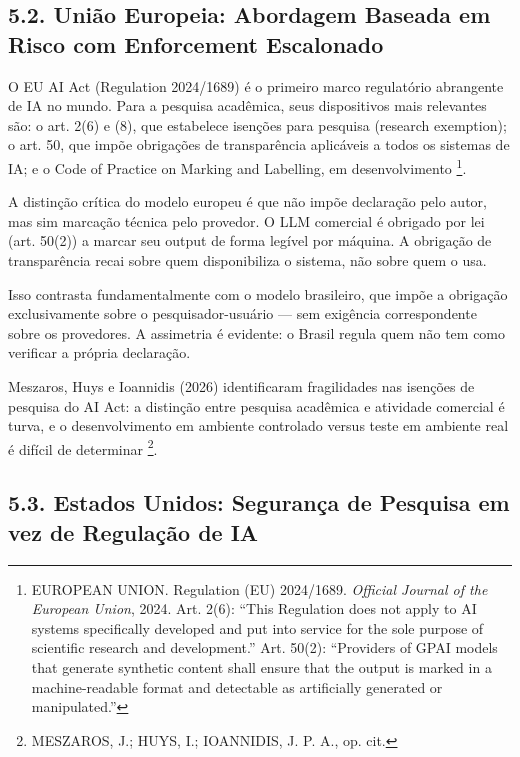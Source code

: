 \documentclass[
  12pt,
  a4paper,
  brazil,
  twoside
]{report}
\begin{document}
\subsection{5.2. União Europeia: Abordagem Baseada em Risco com
Enforcement
Escalonado}\label{uniuxe3o-europeia-abordagem-baseada-em-risco-com-enforcement-escalonado}

O EU AI Act (Regulation 2024/1689) é o primeiro marco regulatório
abrangente de IA no mundo. Para a pesquisa acadêmica, seus dispositivos
mais relevantes são: o art. 2(6) e (8), que estabelece isenções para
pesquisa (research exemption); o art. 50, que impõe obrigações de
transparência aplicáveis a todos os sistemas de IA; e o Code of Practice
on Marking and Labelling, em desenvolvimento \footnote{EUROPEAN UNION.
  Regulation (EU) 2024/1689. \emph{Official Journal of the European
  Union}, 2024. Art. 2(6): ``This Regulation does not apply to AI
  systems specifically developed and put into service for the sole
  purpose of scientific research and development.'' Art. 50(2):
  ``Providers of GPAI models that generate synthetic content shall
  ensure that the output is marked in a machine-readable format and
  detectable as artificially generated or manipulated.''}.

A distinção crítica do modelo europeu é que não impõe declaração pelo
autor, mas sim marcação técnica pelo provedor. O LLM comercial é
obrigado por lei (art. 50(2)) a marcar seu output de forma legível por
máquina. A obrigação de transparência recai sobre quem disponibiliza o
sistema, não sobre quem o usa.

Isso contrasta fundamentalmente com o modelo brasileiro, que impõe a
obrigação exclusivamente sobre o pesquisador-usuário --- sem exigência
correspondente sobre os provedores. A assimetria é evidente: o Brasil
regula quem não tem como verificar a própria declaração.

Meszaros, Huys e Ioannidis (2026) identificaram fragilidades nas
isenções de pesquisa do AI Act: a distinção entre pesquisa acadêmica e
atividade comercial é turva, e o desenvolvimento em ambiente controlado
versus teste em ambiente real é difícil de determinar \footnote{MESZAROS,
  J.; HUYS, I.; IOANNIDIS, J. P. A., op. cit.}.

\subsection{5.3. Estados Unidos: Segurança de Pesquisa em vez de
Regulação de
IA}\label{estados-unidos-seguranuxe7a-de-pesquisa-em-vez-de-regulauxe7uxe3o-de-ia}
\end{document}

